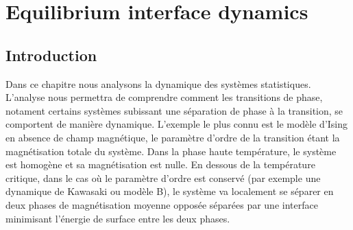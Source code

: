 \chapter{Equilibrium interface dynamics}

    \section{Introduction}

Dans ce chapitre nous analysons la dynamique des systèmes statistiques. L'analyse nous permettra de comprendre comment les transitions de phase, notament certains systèmes subissant une séparation de phase à la transition, se comportent de manière dynamique. L'exemple le plus connu est le modèle d'Ising en absence de champ magnétique, le paramètre d'ordre de la transition étant la magnétisation totale du système. Dans la phase haute température, le système est homogène et sa magnétisation est nulle. En dessous de la température critique, dans le cas où le paramètre d'ordre est conservé (par exemple une dynamique de Kawasaki ou modèle B), le système va localement se séparer en deux phases de magnétisation moyenne opposée séparées par une interface minimisant l'énergie de surface entre les deux phases. 

